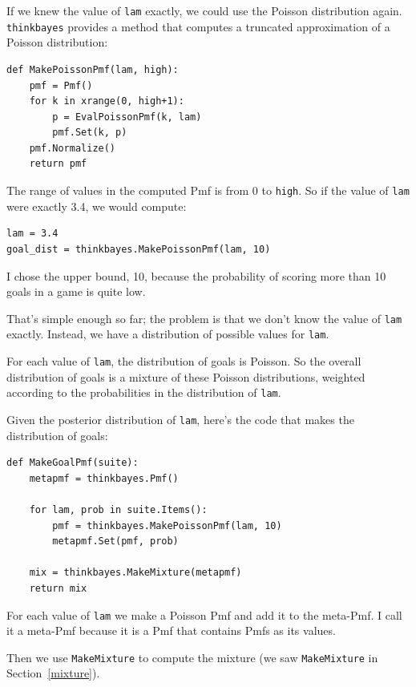 \documentclass[12pt]{book}
\begin{document}
If we knew the value of {\tt lam} exactly, we could use the
Poisson distribution again.  \verb"thinkbayes" provides a
method that computes a truncated approximation of a Poisson
distribution:

\begin{verbatim}
def MakePoissonPmf(lam, high):
    pmf = Pmf()
    for k in xrange(0, high+1):
        p = EvalPoissonPmf(k, lam)
        pmf.Set(k, p)
    pmf.Normalize()
    return pmf
\end{verbatim}  

The range of values in the computed Pmf is from 0 to {\tt high}.
So if the value of {\tt lam} were exactly 3.4, we would compute:

\begin{verbatim}
lam = 3.4
goal_dist = thinkbayes.MakePoissonPmf(lam, 10)
\end{verbatim}

I chose the upper bound, 10, because the probability of scoring
more than 10 goals in a game is quite low.

That's simple enough so far; the problem is that we don't know
the value of {\tt lam} exactly.  Instead, we have a distribution
of possible values for {\tt lam}.

For each value of {\tt lam}, the distribution of goals is Poisson.
So the overall distribution of goals is a mixture of these
Poisson distributions, weighted according to the probabilities
in the distribution of {\tt lam}.

Given the posterior distribution of {\tt lam}, here's the code
that makes the distribution of goals:

\begin{verbatim}
def MakeGoalPmf(suite):
    metapmf = thinkbayes.Pmf()

    for lam, prob in suite.Items():
        pmf = thinkbayes.MakePoissonPmf(lam, 10)
        metapmf.Set(pmf, prob)

    mix = thinkbayes.MakeMixture(metapmf)
    return mix
\end{verbatim}  

For each value of {\tt lam} we make a Poisson Pmf and add it to the
meta-Pmf.  I call it a meta-Pmf because it is a Pmf that contains
Pmfs as its values.

Then we use \verb"MakeMixture" to compute the mixture
(we saw {\tt MakeMixture} in Section~\ref{mixture}).
\end{document}
